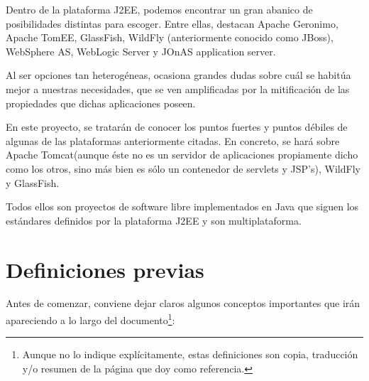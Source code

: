 \documentclass[a4paper, 10pt]{article}
\begin{document}
	Dentro de la plataforma J2EE, podemos encontrar un gran abanico de posibilidades distintas
	para escoger. Entre ellas, destacan Apache Geronimo, Apache TomEE, GlassFish, WildFly
	(anteriormente conocido como JBoss), WebSphere AS, WebLogic Server y JOnAS application
	server.
	
	Al ser opciones tan heterogéneas, ocasiona grandes dudas sobre cuál se habitúa mejor a
	nuestras necesidades, que se ven amplificadas por la mitificación de las propiedades
	que dichas aplicaciones poseen.
	
	En este proyecto, se tratarán de conocer los puntos fuertes y puntos débiles de algunas
	de las plataformas anteriormente citadas. En concreto, se hará sobre Apache Tomcat(aunque
	éste no es un servidor de aplicaciones propiamente dicho como los otros, sino más bien
	es sólo un contenedor de servlets y JSP's), WildFly y GlassFish.
	
	Todos ellos son proyectos de software libre implementados en Java que siguen los
	estándares definidos por la plataforma J2EE y son multiplataforma.
	
\section{Definiciones previas}
	Antes de comenzar, conviene dejar claros algunos conceptos importantes que irán
	apareciendo	a lo largo del documento\footnote{Aunque no lo indique explícitamente,
	estas definiciones son copia, traducción y/o resumen de la página que doy como
	referencia.}:
\end{document}
